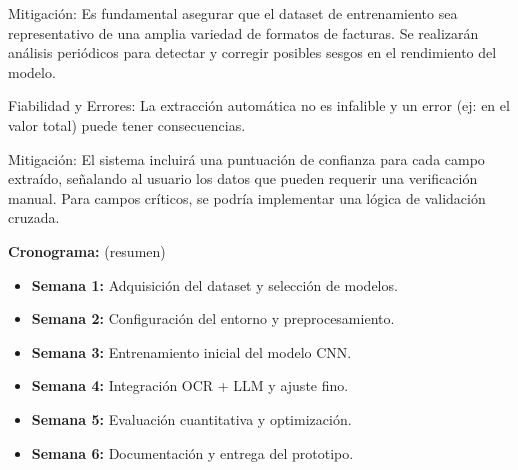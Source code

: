 \documentclass[11pt,letterpaper]{article}
\begin{document}
Mitigación: Es fundamental asegurar que el dataset de entrenamiento sea representativo de una amplia variedad de formatos de facturas. Se realizarán análisis periódicos para detectar y corregir posibles sesgos en el rendimiento del modelo.

Fiabilidad y Errores: La extracción automática no es infalible y un error (ej: en el valor total) puede tener consecuencias.

Mitigación: El sistema incluirá una puntuación de confianza para cada campo extraído, señalando al usuario los datos que pueden requerir una verificación manual. Para campos críticos, se podría implementar una lógica de validación cruzada.

\textbf{Cronograma:} (resumen)
\begin{itemize}[leftmargin=1.5em]
    \item \textbf{Semana 1:} Adquisición del dataset y selección de modelos.
    \item \textbf{Semana 2:} Configuración del entorno y preprocesamiento.
    \item \textbf{Semana 3:} Entrenamiento inicial del modelo CNN.
    \item \textbf{Semana 4:} Integración OCR + LLM y ajuste fino.
    \item \textbf{Semana 5:} Evaluación cuantitativa y optimización.
    \item \textbf{Semana 6:} Documentación y entrega del prototipo.
\end{itemize}



\end{document}
